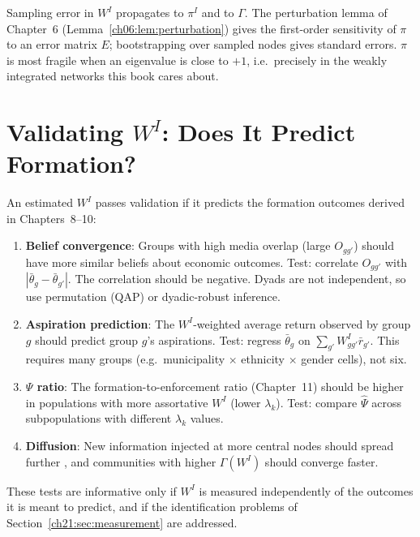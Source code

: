 \documentclass[../structural_economics_book.tex]{subfiles}
\begin{document}
Sampling error in $W^I$ propagates to $\pi^I$ and to $\Gamma$. The perturbation lemma of Chapter~6 (Lemma~\ref{ch06:lem:perturbation}) gives the first-order sensitivity of $\pi$ to an error matrix $E$; bootstrapping over sampled nodes gives standard errors. $\pi$ is most fragile when an eigenvalue is close to $+1$, i.e.\ precisely in the weakly integrated networks this book cares about.


\section{Validating $W^I$: Does It Predict Formation?}
\label{ch21:sec:validation}

\begin{definition}\label{ch21:prop:validation}
An estimated $W^I$ passes validation if it predicts the formation outcomes derived in Chapters~8--10:
\begin{enumerate}
\item \textbf{Belief convergence}: Groups with high media overlap (large $O_{gg'}$) should have more similar beliefs about economic outcomes. Test: correlate $O_{gg'}$ with $|\bar{\theta}_g - \bar{\theta}_{g'}|$. The correlation should be negative. Dyads are not independent, so use permutation (QAP) or dyadic-robust inference.

\item \textbf{Aspiration prediction}: The $W^I$-weighted average return observed by group $g$ should predict group $g$'s aspirations. Test: regress $\bar{\theta}_g$ on $\sum_{g'} W^I_{gg'}\bar{r}_{g'}$. This requires many groups (e.g.\ municipality $\times$ ethnicity $\times$ gender cells), not six.

\item \textbf{$\Psi$ ratio}: The formation-to-enforcement ratio (Chapter~11) should be higher in populations with more assortative $W^I$ (lower $\lambda_k$). Test: compare $\hat{\Psi}$ across subpopulations with different $\lambda_k$ values.

\item \textbf{Diffusion}: New information injected at more central nodes should spread further \citep[as in][]{banerjee2013diffusion}, and communities with higher $\Gamma(W^I)$ should converge faster.
\end{enumerate}
These tests are informative only if $W^I$ is measured independently of the outcomes it is meant to predict, and if the identification problems of Section~\ref{ch21:sec:measurement} are addressed.
\end{definition}
\end{document}
